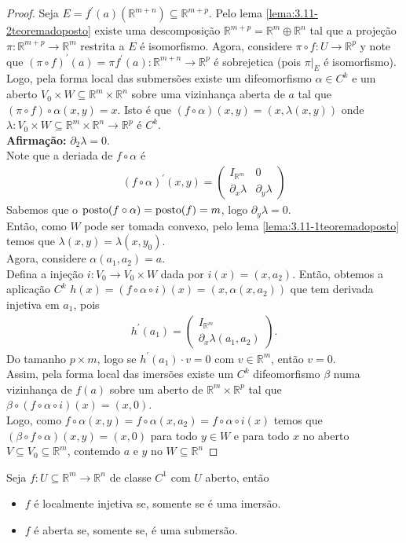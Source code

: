 \begin{proof} 
  Seja $E=f^{\prime}(a)\left( \mathbb{R}^{m+n} \right)\subseteq \mathbb{R}^{m+p}$. Pelo lema \ref{lema:3.11-2teoremadoposto} existe uma descomposição $\mathbb{R}^{m+p}=\mathbb{R}^{m}\oplus\mathbb{R}^{n}$ tal que a projeção $\pi:\mathbb{R}^{m+p}\to\mathbb{R}^{m}$ restrita a $E$ é isomorfismo. Agora, considere $\pi\circ f:U\to\mathbb{R}^{p}$ y note que $(\pi\circ f)^{\prime}(a)=\pi f^{\prime}(a):\mathbb{R}^{m+n}\to\mathbb{R}^{p}$ é sobrejetica (pois $\pi\big|_{E}$ é isomorfismo).\\
  Logo, pela forma local das submersões existe um difeomorfismo $\alpha\in C^{k}$ e um aberto $V_{0}\times W\subseteq \mathbb{R}^{m}\times\mathbb{R}^{n}$ sobre uma vizinhança aberta de $a$ tal que $(\pi\circ f)\circ \alpha(x,y)=x$. Isto é que $(f\circ \alpha)(x,y)=(x,\lambda(x,y))$ onde $\lambda:V_{0}\times W\subseteq \mathbb{R}^{m}\times\mathbb{R}^{n}\to\mathbb{R}^{p}$ é $C^{k}$.\\
  \textbf{Afirmação:} $\partial_{2}\lambda=0$.\\
  Note que a deriada de $f\circ \alpha$ é
  \begin{align*}
    (f\circ \alpha)^{\prime}(x,y)=\begin{pmatrix}
      I_{\mathbb{R}^{m}} & 0 \\
      \partial_{x}\lambda & \partial_{y}\lambda
    \end{pmatrix}
  \end{align*}
  Sabemos que o $\operatorname{posto}(f\circ\alpha)=\operatorname{posto}(f)=m$, logo $\partial_{y}\lambda=0$.\\
  Então, como $W$ pode ser tomada convexo, pelo lema \ref{lema:3.11-1teoremadoposto} temos que $\lambda(x,y)=\lambda(x,y_0)$.\\
  Agora, considere $\alpha(a_1,a_2)=a$.\\
  Defina a injeção $i:V_{0}\to V_{0}\times W$ dada por $i(x)=(x,a_2)$. Então, obtemos a aplicação $C^{k}$ $h(x)=(f\circ\alpha\circ i)(x)=(x,\alpha(x,a_{2}))$ que tem derivada injetiva em $a_1$, pois
  \begin{align*}
    h^{\prime}(a_1)=\begin{pmatrix}
      I_{\mathbb{R}^{m}} \\
      \partial_{x}\lambda(a_1,a_2)
    \end{pmatrix}.
  \end{align*}
  Do tamanho $p\times m$, logo se $h^{\prime}(a_1)\cdot v=0$ com $v\in\mathbb{R}^{m}$, então $v=0$.\\
  Assim, pela forma local das imersões existe um $C^{k}$ difeomorfismo $\beta$ numa vizinhança de $f(a)$ sobre um aberto de $\mathbb{R}^{m}\times\mathbb{R}^{p}$ tal que $\beta\circ(f\circ\alpha\circ i)(x)=(x,0)$.\\
  Logo, como $f\circ \alpha(x,y)=f\circ\alpha(x,a_2)=f\circ\alpha\circ i(x)$ temos que $(\beta\circ f\circ\alpha)(x,y)=(x,0)$ para todo $y\in W$ e para todo $x$ no aberto $V\subseteq V_{0}\subseteq \mathbb{R}^{m}$, contemdo $a$ e $y$ no $W\subseteq\mathbb{R}^{n}$ 
\end{proof}
\begin{corollary}
  Seja $f:U\subseteq\mathbb{R}^{m}\to\mathbb{R}^{n}$ de classe $C^{1}$ com $U$ aberto, então
  \begin{itemize}
    \item $f$ é localmente injetiva se, somente se é uma imersão.
    \item $f$ é aberta se, somente se, é uma submersão. 
  \end{itemize}
\end{corollary}
